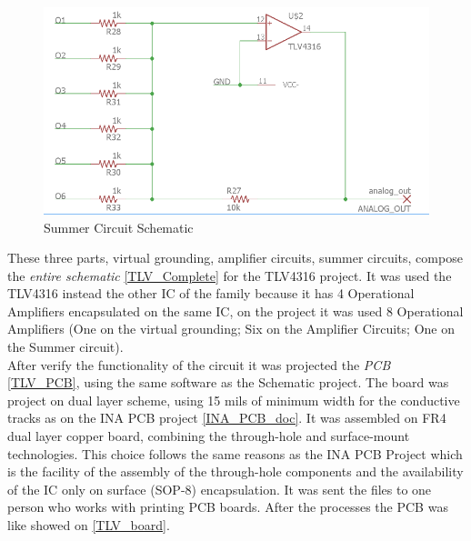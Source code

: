 \begin{figure}[!htpb]
\centering
\caption{Summer Circuit Schematic}
\label{Sum_Sch}
\includegraphics[scale=0.4]{images/tlv_sum}
\end{figure}

These three parts, virtual grounding, amplifier circuits, summer circuits, compose the \textit{entire schematic} \autoref{TLV_Complete} for the TLV4316 project. It was used the TLV4316 instead the other IC of the family
because it has 4 Operational Amplifiers encapsulated on the same IC, on the project it was used 8 Operational Amplifiers (One on the virtual grounding; Six on the Amplifier Circuits; One on
the Summer circuit).\\

After verify the functionality of the circuit it was projected the \textit{PCB} \autoref{TLV_PCB}, using the same software as the Schematic project. The board was project on dual layer
scheme, using 15 mils of minimum width for the conductive tracks as on the INA PCB project \autoref{INA_PCB_doc}. It was assembled on FR4 dual layer copper
board, combining the through-hole and surface-mount technologies. This choice follows the same reasons as the INA PCB Project which is
the facility of the assembly of the through-hole components and the availability
of the IC only on surface (SOP-8) encapsulation. It was sent
the files to one person who works with printing PCB boards. After the processes
the PCB was like showed on \autoref{TLV_board}.\\

